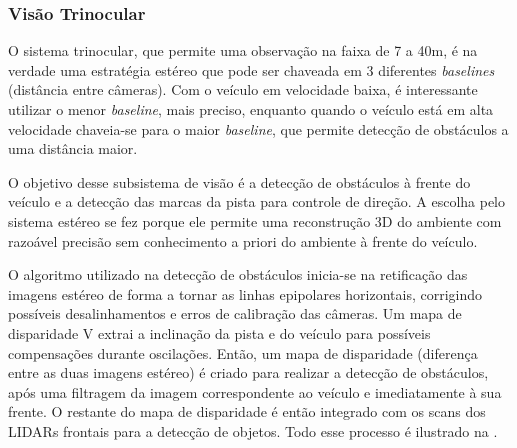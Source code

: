 \subsubsection{Visão Trinocular}

O sistema trinocular, que permite uma observação na faixa de 7 a 40m, é na verdade uma estratégia estéreo que pode ser chaveada em 3 diferentes \emph{baselines} (distância entre câmeras). Com o veículo em velocidade baixa, é interessante utilizar o menor \emph{baseline}, mais preciso, enquanto quando o veículo está em alta velocidade chaveia-se para o maior \emph{baseline}, que permite detecção de obstáculos a uma distância maior.

O objetivo desse subsistema de visão é a detecção de obstáculos à frente do veículo e a detecção das marcas da pista para controle de direção. A escolha pelo sistema estéreo se fez porque ele permite uma reconstrução 3D do ambiente com razoável precisão sem conhecimento a priori do ambiente à frente do veículo.

O algoritmo utilizado na detecção de obstáculos inicia-se na retificação das imagens estéreo de forma a tornar as linhas epipolares horizontais, corrigindo possíveis desalinhamentos e erros de calibração das câmeras. Um mapa de disparidade V extrai a inclinação da pista e do veículo para possíveis compensações durante oscilações. Então, um mapa de disparidade (diferença entre as duas imagens estéreo) é criado para realizar a detecção de obstáculos, após uma filtragem da imagem correspondente ao veículo e imediatamente à sua frente. O restante do mapa de disparidade é então integrado com os scans dos LIDARs frontais para a detecção de objetos. Todo esse processo é ilustrado na .

